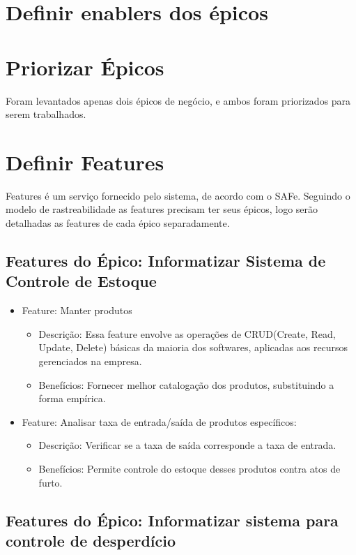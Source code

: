 \section{Definir enablers dos épicos}

\section{Priorizar Épicos}
Foram levantados apenas dois épicos de negócio, e ambos foram priorizados para serem trabalhados.

\section{Definir Features}
Features é um serviço fornecido pelo sistema, de acordo com o SAFe. Seguindo o modelo de rastreabilidade as features precisam ter seus épicos, logo serão detalhadas as features de cada épico separadamente.

\subsection{Features do Épico: Informatizar Sistema de Controle de Estoque}

\begin{itemize}
\item Feature: Manter produtos
\begin{itemize}
\item Descrição: Essa feature envolve as operações de CRUD(Create, Read, Update, Delete) básicas da maioria dos softwares, aplicadas aos recursos gerenciados na empresa.
\item Benefícios: Fornecer melhor catalogação dos produtos, substituindo a forma empírica.
\end{itemize}

\item Feature: Analisar taxa de entrada/saída de produtos específicos:
\begin{itemize}
	\item Descrição: Verificar se a taxa de saída corresponde a taxa de entrada.
	\item Benefícios: Permite controle do estoque desses produtos contra atos de furto.
\end{itemize}

\end{itemize}	

\subsection{Features do Épico: Informatizar sistema para controle de desperdício}

